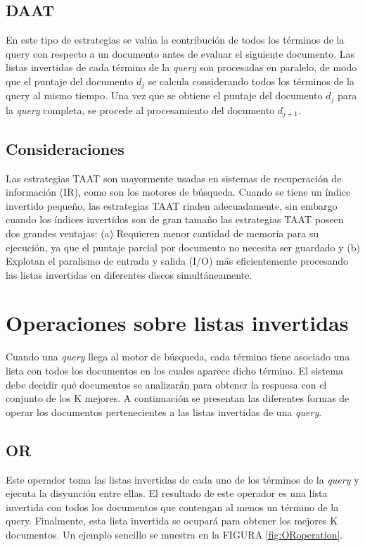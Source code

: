 \subsection{DAAT}
En este tipo de estrategias se valúa la contribución de todos los términos de la query con respecto a un documento antes de evaluar el siguiente documento. Las listas invertidas de cada término de la \textit{query} son procesadas en paralelo, de modo que el puntaje del documento $d_{j}$ se calcula considerando todos los términos de la query al mismo tiempo. Una vez que se obtiene el puntaje del documento $d_{j}$ para la \textit{query} completa, se procede al procesamiento del documento $d_{j+1}$.

\subsection{Consideraciones}
Las estrategias TAAT son mayormente usadas en sistemas de recuperación de información (IR), como son los motores de búsqueda. 
Cuando se tiene un índice invertido pequeño, las estrategias TAAT rinden adecuadamente, sin embargo cuando los índices invertidos son de gran tamaño las estrategias TAAT poseen dos grandes ventajas: (a) Requieren menor cantidad de memoria para su ejecución, ya que el puntaje parcial por documento no necesita ser guardado y (b) Explotan el paralismo de entrada y salida (I/O) más eficientemente procesando las listas invertidas en diferentes discos simultáneamente.


\section{Operaciones sobre listas invertidas}
\label{marco:osli}
Cuando una \textit{query} llega al motor de búsqueda, cada término tiene asociado una lista con todos los documentos en los cuales aparece dicho término. El sistema debe decidir qué documentos se analizarán para obtener la respuesa con el conjunto de los K mejores. 
A continuación se presentan las diferentes formas de operar los documentos pertenecientes a las listas invertidas de una \textit{query}.

\subsection{OR}
\label{marco:or}
Este operador toma las listas invertidas de cada uno de los términos de la \textit{query} y ejecuta la disyunción entre ellas. El resultado de este operador es una lista invertida con todos los documentos que contengan al menos un término de la query. Finalmente, esta lista invertida se ocupará para obtener los mejores K documentos. Un ejemplo sencillo se muestra en la FIGURA \ref{fig:ORoperation}.

